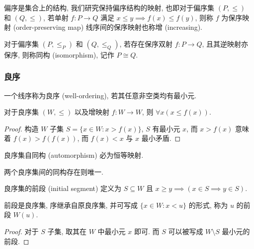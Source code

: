 \begin{definition}
    偏序是集合上的结构, 我们研究保持偏序结构的映射, 也即对于偏序集 \((P, \le)\) 和 \((Q, \le)\),
    若单射 \(f : P \to Q\) 满足 \(x \le y \implies f(x) \le f(y)\), 则称 \(f\) 为保序映射 (order-preserving map)
    线序间的保序映射也称增 (increasing).
\end{definition}

\begin{definition}
    对于偏序集 \((P, \le_P)\) 和 \((Q, \le_Q)\), 若存在保序双射 \(f : P \to Q\), 且其逆映射亦保序, 则称同构 (isomorphism), 记作 \(P \cong Q\).
\end{definition}

\subsubsection{良序}

\begin{definition}
    一个线序称为良序 (well-ordering), 若其任意非空类均有最小元.
\end{definition}

\begin{lemma}
    \label{lemma:well-ordering increasing map lemma}
    对于良序集 \((W, \le)\) 以及增映射 \(f : W \to W\), 则 \(\forall x (x \le f(x))\).

    \begin{proof}
        构造 \(W\) 子集 \(S = \{x \in W : x > f(x)\}\), \(S\) 有最小元 \(x\),
        而 \(x > f(x)\) 意味着 \(f(x) > f(f(x))\), 而 \(f(x) < x\) 与 \(x\) 最小矛盾.
    \end{proof}
\end{lemma}

\begin{corollary}
    良序集自同构 (automorphism) 必为恒等映射.
\end{corollary}

\begin{corollary}
    两个良序集间的同构存在则唯一.
\end{corollary}

\begin{definition}
    良序集的前段 (initial segment) 定义为 \(S \subseteq W\) 且 \(x \ge y \implies (x \in S \implies y \in S)\).
\end{definition}

\begin{lemma}
    \label{lemma:well-ordering segment is well-ordering lemma}
    前段是良序集, 序继承自原良序集, 并可写成 \(\{x \in W : x < u\}\) 的形式, 称为 \(u\) 的前段 \(W(u)\).

    \begin{proof}
        对于 \(S\) 子集, 取其在 \(W\) 中最小元 \(x\) 即可. 而 \(S\) 可以被写成 \(W \setminus S\) 最小元的前段.
    \end{proof}
\end{lemma}

